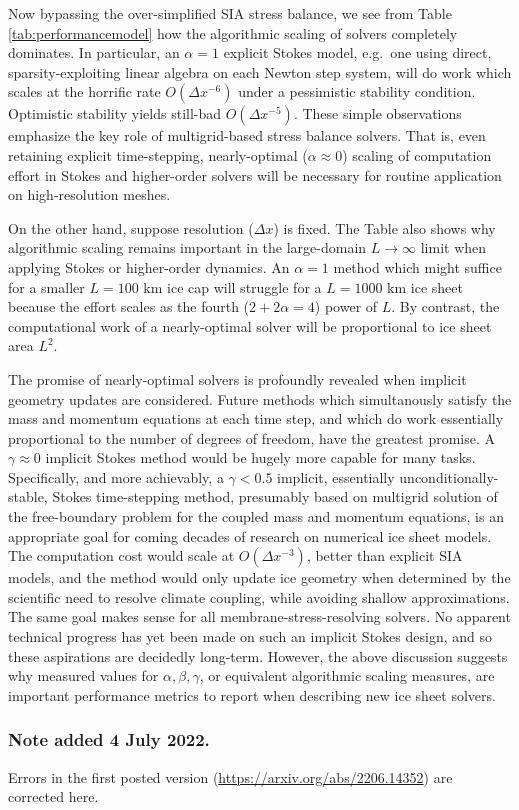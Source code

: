 \documentclass[review,letterpaper]{igs}
\begin{document}
Now bypassing the over-simplified SIA stress balance, we see from Table \ref{tab:performancemodel} how the algorithmic scaling of solvers completely dominates.  In particular, an $\alpha=1$ explicit Stokes model, e.g.~one using direct, sparsity-exploiting linear algebra on each Newton step system, will do work which scales at the horrific rate $O(\Delta x^{-6})$ under a pessimistic stability condition.  Optimistic stability yields still-bad $O(\Delta x^{-5})$.  These simple observations emphasize the key role of multigrid-based stress balance solvers.  That is, even retaining explicit time-stepping, nearly-optimal ($\alpha \approx 0$) scaling of computation effort in Stokes and higher-order solvers will be necessary for routine application on high-resolution meshes.

On the other hand, suppose resolution ($\Delta x$) is fixed.  The Table also shows why algorithmic scaling remains important in the large-domain $L\to\infty$ limit when applying Stokes or higher-order dynamics.  An $\alpha=1$ method which might suffice for a smaller $L=100$ km ice cap will struggle for a $L=1000$ km ice sheet because the effort scales as the fourth ($2+2\alpha=4$) power of $L$.  By contrast, the computational work of a nearly-optimal solver will be proportional to ice sheet area $L^2$.

The promise of nearly-optimal solvers is profoundly revealed when implicit geometry updates are considered.  Future methods which simultanously satisfy the mass and momentum equations at each time step, and which do work essentially proportional to the number of degrees of freedom, have the greatest promise.  A $\gamma \approx 0$ implicit Stokes method would be hugely more capable for many tasks.  Specifically, and more achievably, a $\gamma < 0.5$ implicit, essentially unconditionally-stable, Stokes time-stepping method, presumably based on multigrid solution of the free-boundary problem for the coupled mass and momentum equations, is an appropriate goal for coming decades of research on numerical ice sheet models.  The computation cost would scale at $O(\Delta x^{-3})$, better than explicit SIA models, and the method would only update ice geometry when determined by the scientific need to resolve climate coupling, while avoiding shallow approximations.  The same goal makes sense for all membrane-stress-resolving solvers.  No apparent technical progress has yet been made on such an implicit Stokes design, and so these aspirations are decidedly long-term.  However, the above discussion suggests why measured values for $\alpha,\beta,\gamma$, or equivalent algorithmic scaling measures, are important performance metrics to report when describing new ice sheet solvers.

\subsubsection{Note added 4 July 2022.}  Errors in the first posted version (\url{https://arxiv.org/abs/2206.14352}) are corrected here.



\end{document}
